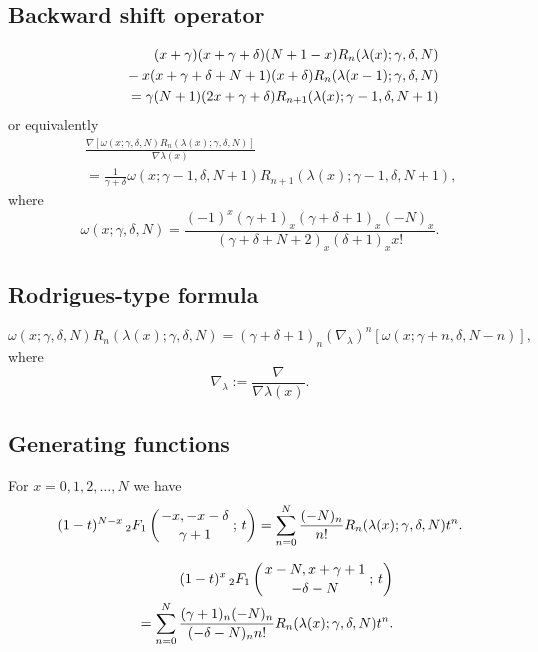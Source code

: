 \documentclass[envcountchap,graybox]{svmono}
\newcommand{\hyp}[5]{\mbox{}_{#1}{F}_{#2}
\left(\genfrac{}{}{0pt}{}{#3}{#4}\,;\,#5\right)}
\newcommand{\mathindent}{\hspace{7.5mm}}
\begin{document}
\subsection*{Backward shift operator}
\begin{eqnarray}
\label{shift2DualHahnI}
& &(x+\gamma)(x+\gamma+\delta)(N+1-x)R_n(\lambda(x);\gamma,\delta,N)\nonumber\\
& &{}\mathindent{}-x(x+\gamma+\delta+N+1)(x+\delta)R_n(\lambda(x-1);\gamma,\delta,N)\nonumber\\
& &{}=\gamma(N+1)(2x+\gamma+\delta)R_{n+1}(\lambda(x);\gamma-1,\delta,N+1)
\end{eqnarray}
or equivalently
\begin{eqnarray}
\label{shift2DualHahnII}
& &\frac{\nabla\left[\omega(x;\gamma,\delta,N)R_n(\lambda(x);\gamma,\delta,N)\right]}{\nabla\lambda(x)}\nonumber\\
& &{}=\frac{1}{\gamma+\delta}\omega(x;\gamma-1,\delta,N+1)R_{n+1}(\lambda(x);\gamma-1,\delta,N+1),
\end{eqnarray}
where
$$\omega(x;\gamma,\delta,N)=\frac{(-1)^x(\gamma+1)_x(\gamma+\delta+1)_x(-N)_x}
{(\gamma+\delta+N+2)_x(\delta+1)_xx!}.$$

\newpage

\subsection*{Rodrigues-type formula}
\begin{equation}
\label{RodDualHahn}
\omega(x;\gamma,\delta,N)R_n(\lambda(x);\gamma,\delta,N)
=(\gamma+\delta+1)_n\left(\nabla_{\lambda}\right)^n\left[\omega(x;\gamma+n,\delta,N-n)\right],
\end{equation}
where
$$\nabla_{\lambda}:=\frac{\nabla}{\nabla\lambda(x)}.$$

\subsection*{Generating functions}
For $x=0,1,2,\ldots,N$ we have
\begin{equation}
\label{GenDualHahn1}
(1-t)^{N-x}\,\hyp{2}{1}{-x,-x-\delta}{\gamma+1}{t}
=\sum_{n=0}^N\frac{(-N)_n}{n!}R_n(\lambda(x);\gamma,\delta,N)t^n.
\end{equation}

\begin{eqnarray}
\label{GenDualHahn2}
& &(1-t)^x\,\hyp{2}{1}{x-N,x+\gamma+1}{-\delta-N}{t}\nonumber\\
& &=\sum_{n=0}^N\frac{(\gamma+1)_n(-N)_n}{(-\delta-N)_nn!}R_n(\lambda(x);\gamma,\delta,N)t^n.
\end{eqnarray}
\end{document}
